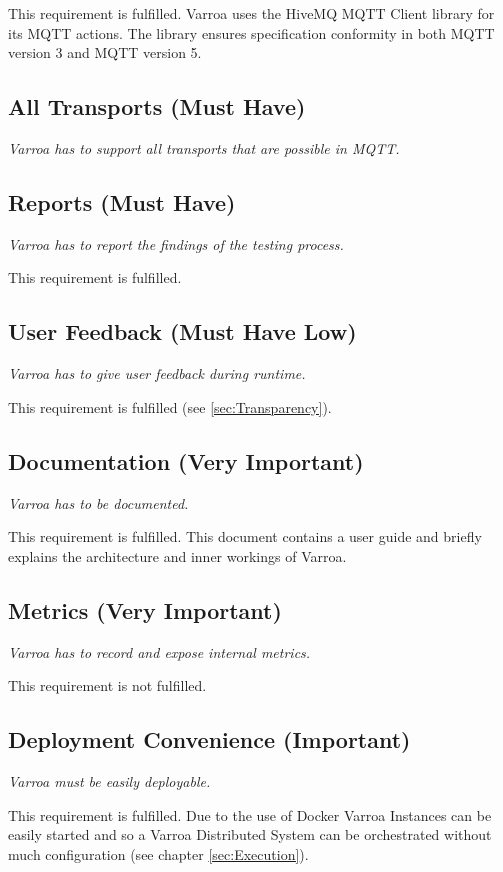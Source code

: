 This requirement is fulfilled.
Varroa uses the HiveMQ MQTT Client library for its MQTT actions.
The library ensures specification conformity in both MQTT version 3 and MQTT version 5.

\subsection{All Transports (Must Have)}
\emph{Varroa has to support all transports that are possible in MQTT.}


\subsection{Reports (Must Have)}
\emph{Varroa has to report the findings of the testing process.}

This requirement is fulfilled.

\subsection{User Feedback (Must Have Low)}
\emph{Varroa has to give user feedback during runtime.}

This requirement is fulfilled (see \ref{sec:Transparency}).

\subsection{Documentation (Very Important)}
\emph{Varroa has to be documented. }

This requirement is fulfilled.
This document contains a user guide and briefly explains the architecture and inner workings of Varroa.

\subsection{Metrics (Very Important)}
\emph{Varroa has to record and expose internal metrics.}

This requirement is not fulfilled.

\subsection{Deployment Convenience (Important)}
\emph{Varroa must be easily deployable.}

This requirement is fulfilled. Due to the use of Docker Varroa Instances can be easily started and so a Varroa Distributed System can be orchestrated without much configuration (see chapter \ref{sec:Execution}).

